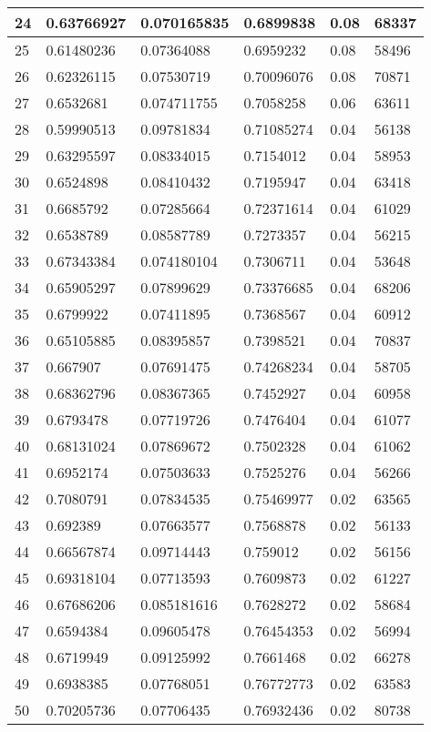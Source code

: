 \begin{longtable}{|l|l|l|l|l|l|}
24 & 0.63766927 & 0.070165835 & 0.6899838 & 0.08 & 68337 \\ \hline 
25 & 0.61480236 & 0.07364088 & 0.6959232 & 0.08 & 58496 \\ \hline 
26 & 0.62326115 & 0.07530719 & 0.70096076 & 0.08 & 70871 \\ \hline 
27 & 0.6532681 & 0.074711755 & 0.7058258 & 0.06 & 63611 \\ \hline 
28 & 0.59990513 & 0.09781834 & 0.71085274 & 0.04 & 56138 \\ \hline 
29 & 0.63295597 & 0.08334015 & 0.7154012 & 0.04 & 58953 \\ \hline 
30 & 0.6524898 & 0.08410432 & 0.7195947 & 0.04 & 63418 \\ \hline 
31 & 0.6685792 & 0.07285664 & 0.72371614 & 0.04 & 61029 \\ \hline 
32 & 0.6538789 & 0.08587789 & 0.7273357 & 0.04 & 56215 \\ \hline 
33 & 0.67343384 & 0.074180104 & 0.7306711 & 0.04 & 53648 \\ \hline 
34 & 0.65905297 & 0.07899629 & 0.73376685 & 0.04 & 68206 \\ \hline 
35 & 0.6799922 & 0.07411895 & 0.7368567 & 0.04 & 60912 \\ \hline 
36 & 0.65105885 & 0.08395857 & 0.7398521 & 0.04 & 70837 \\ \hline 
37 & 0.667907 & 0.07691475 & 0.74268234 & 0.04 & 58705 \\ \hline 
38 & 0.68362796 & 0.08367365 & 0.7452927 & 0.04 & 60958 \\ \hline 
39 & 0.6793478 & 0.07719726 & 0.7476404 & 0.04 & 61077 \\ \hline 
40 & 0.68131024 & 0.07869672 & 0.7502328 & 0.04 & 61062 \\ \hline 
41 & 0.6952174 & 0.07503633 & 0.7525276 & 0.04 & 56266 \\ \hline 
42 & 0.7080791 & 0.07834535 & 0.75469977 & 0.02 & 63565 \\ \hline 
43 & 0.692389 & 0.07663577 & 0.7568878 & 0.02 & 56133 \\ \hline 
44 & 0.66567874 & 0.09714443 & 0.759012 & 0.02 & 56156 \\ \hline 
45 & 0.69318104 & 0.07713593 & 0.7609873 & 0.02 & 61227 \\ \hline 
46 & 0.67686206 & 0.085181616 & 0.7628272 & 0.02 & 58684 \\ \hline 
47 & 0.6594384 & 0.09605478 & 0.76454353 & 0.02 & 56994 \\ \hline 
48 & 0.6719949 & 0.09125992 & 0.7661468 & 0.02 & 66278 \\ \hline 
49 & 0.6938385 & 0.07768051 & 0.76772773 & 0.02 & 63583 \\ \hline 
50 & 0.70205736 & 0.07706435 & 0.76932436 & 0.02 & 80738 \\ \hline 
\end{longtable}